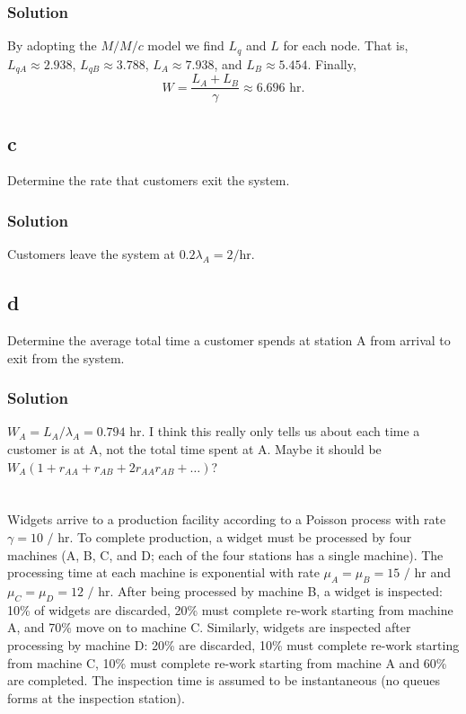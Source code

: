 \documentclass[letterpaper]{amsart}
\begin{document}
\subsubsection*{Solution}
By adopting the $M/M/c$ model we find $L_q$ and $L$ for each node.
That is, $L_{qA}\approx 2.938$,
$L_{qB}\approx 3.788$,
$L_{A}\approx 7.938$,
and $L_{B}\approx 5.454$.
Finally,
\begin{equation*}
  W=\frac{L_A+L_B}{\gamma}\approx 6.696\text{ hr}.
\end{equation*}

\subsection*{c}
Determine the rate that customers exit the system.
\subsubsection*{Solution}
Customers leave the system at $0.2\lambda_A=2/\text{hr}$.
\subsection*{d}
Determine the average total time a customer spends at station A from
arrival to exit from the system.
\subsubsection*{Solution}
$W_A=L_A/\lambda_A= 0.794\text{ hr}$. I think this really only tells us about
each time a customer is at A, not the total time spent at A.
Maybe it should be $W_A(1 + r_{AA} + r_{AB} + 2r_{AA}r_{AB} + \dots)$?


\section{} %
Widgets arrive to a production facility according to a Poisson process with rate
$\gamma=10\text{ / hr}$. To complete production, a widget must be processed by
four machines (A, B, C, and D; each of the four stations has a single machine).
The processing time at each machine is exponential with rate $\mu_A = \mu_B =
15\text{ / hr}$ and $\mu_C = \mu_D = 12\text{ / hr}$. After being processed by
machine B, a widget is inspected: 10\% of widgets are discarded, 20\% must
complete re-work starting from machine A, and 70\% move on to machine C.
Similarly, widgets are inspected after processing by machine D: 20\% are
discarded, 10\% must complete re-work starting from machine C, 10\% must
complete re-work starting from machine A and 60\% are completed. The inspection
time is assumed to be instantaneous (no queues forms at the inspection station).
\end{document}
